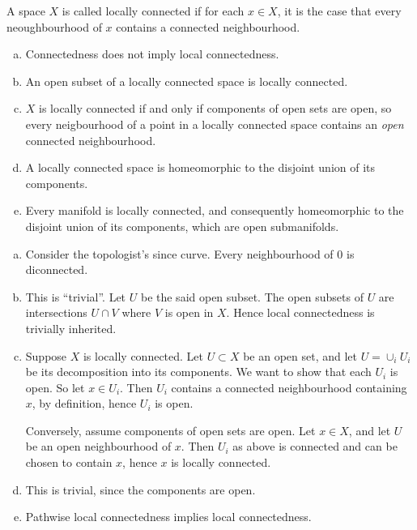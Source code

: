 \documentclass[11pt, english]{article}
\begin{document}
\begin{exc}[Exercise 4]
A space $X$ is called locally connected if for each $x \in X$, it is the case that every neoughbourhood of $x$ contains a connected neighbourhood. 
\begin{enumerate}[a)]
\item Connectedness does not imply local connectedness.
\item An open subset of a locally connected space is locally connected.
\item $X$ is locally connected if and only if components of open sets are open, so every neigbourhood of a point in a locally connected space contains an \emph{open} connected neighbourhood.
\item A locally connected space is homeomorphic to the disjoint union of its components.
\item Every manifold is locally connected, and consequently homeomorphic to the disjoint union of its components, which are open submanifolds.
\end{enumerate}
\end{exc}
\begin{sol}
  \begin{enumerate}[a)]
  \item Consider the topologist's since curve. Every neighbourhood of $0$ is diconnected.
\item This is ``trivial''. Let $U$ be the said open subset. The open subsets of $U$ are intersections $U \cap V$ where $V$ is open in $X$. Hence local connectedness is trivially inherited.
\item Suppose $X$ is locally connected. Let $U \subset X$ be an open set, and let $U= \cup_i U_i$ be its decomposition into its components. We want to show that each $U_i$ is open. So let $x \in U_i$. Then $U_i$ contains a connected neighbourhood containing $x$, by definition, hence $U_i$ is open.

Conversely, assume components of open sets are open. Let $x \in X$, and let $U$ be an open neighbourhood of $x$. Then $U_i$ as above is connected and can be chosen to contain $x$, hence $x$ is locally connected.

\item This is trivial, since the components are open.

\item Pathwise local connectedness implies local connectedness.
  \end{enumerate}
\end{sol}
\end{document}
